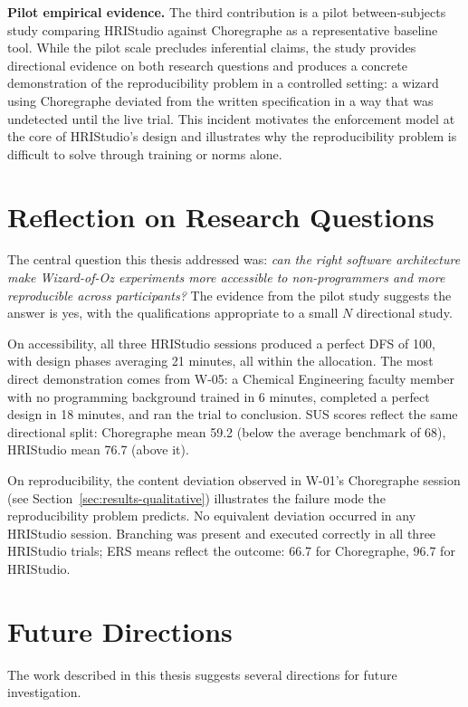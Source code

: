 \textbf{Pilot empirical evidence.} The third contribution is a pilot between-subjects study comparing HRIStudio against Choregraphe as a representative baseline tool. While the pilot scale precludes inferential claims, the study provides directional evidence on both research questions and produces a concrete demonstration of the reproducibility problem in a controlled setting: a wizard using Choregraphe deviated from the written specification in a way that was undetected until the live trial. This incident motivates the enforcement model at the core of HRIStudio's design and illustrates why the reproducibility problem is difficult to solve through training or norms alone.

\section{Reflection on Research Questions}

The central question this thesis addressed was: \emph{can the right software architecture make Wizard-of-Oz experiments more accessible to non-programmers and more reproducible across participants?} The evidence from the pilot study suggests the answer is yes, with the qualifications appropriate to a small $N$ directional study.

On accessibility, all three HRIStudio sessions produced a perfect DFS of 100, with design phases averaging 21 minutes, all within the allocation. The most direct demonstration comes from W-05: a Chemical Engineering faculty member with no programming background trained in 6 minutes, completed a perfect design in 18 minutes, and ran the trial to conclusion. SUS scores reflect the same directional split: Choregraphe mean 59.2 (below the average benchmark of 68), HRIStudio mean 76.7 (above it).

On reproducibility, the content deviation observed in W-01's Choregraphe session (see Section~\ref{sec:results-qualitative}) illustrates the failure mode the reproducibility problem predicts. No equivalent deviation occurred in any HRIStudio session. Branching was present and executed correctly in all three HRIStudio trials; ERS means reflect the outcome: 66.7 for Choregraphe, 96.7 for HRIStudio.

\section{Future Directions}

The work described in this thesis suggests several directions for future investigation.

